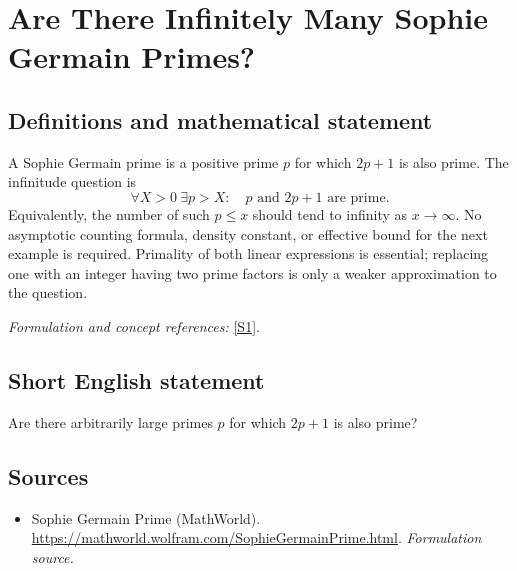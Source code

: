 \documentclass[11pt]{article}
\begin{document}
\section*{\texorpdfstring{Are There Infinitely Many Sophie Germain Primes?}{Are There Infinitely Many Sophie Germain Primes?}}\label{statement}
\subsection{Definitions and mathematical statement}
A Sophie Germain prime is a positive prime $p$ for which $2p+1$ is also prime. The infinitude question is
\[
 \forall X>0\ \exists p>X:\quad p\text{ and }2p+1\text{ are prime}.
\]
Equivalently, the number of such $p\le x$ should tend to infinity as $x\to\infty$. No asymptotic counting formula, density constant, or effective bound for the next example is required. Primality of both linear expressions is essential; replacing one with an integer having two prime factors is only a weaker approximation to the question.
\par\smallskip\textit{Formulation and concept references:} \href{https://mathworld.wolfram.com/SophieGermainPrime.html}{[S1]}.

\subsection{Short English statement}
Are there arbitrarily large primes $p$ for which $2p+1$ is also prime?
\subsection{Sources}
\begin{itemize}
\item[S1]Sophie Germain Prime (MathWorld).
\url{https://mathworld.wolfram.com/SophieGermainPrime.html}.
\textit{Formulation source.}
\end{itemize}
\end{document}
